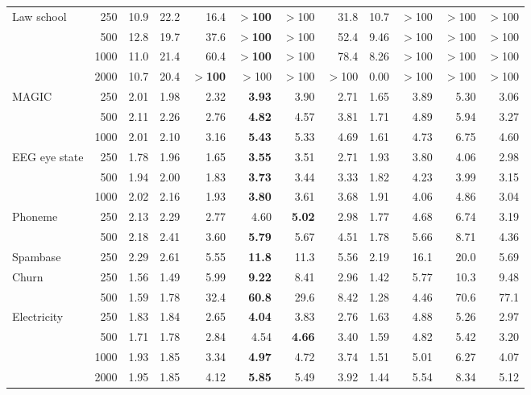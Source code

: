 \begin{tabular}{lrrrrrrrr rrr}
Law school & 250 & 10.9 & 22.2 & 16.4 & \textbf{$>$100} & $>$100 & 31.8 & 10.7 & $>$100 & $>$100 & $>$100 \\
 & 500 & 12.8 & 19.7 & 37.6 & \textbf{$>$100} & $>$100 & 52.4 & 9.46 & $>$100 & $>$100 & $>$100 \\
 & 1000 & 11.0 & 21.4 & 60.4 & \textbf{$>$100} & $>$100 & 78.4 & 8.26 & $>$100 & $>$100 & $>$100 \\
 & 2000 & 10.7 & 20.4 & \textbf{$>$100} & $>$100 & $>$100 & $>$100 & 0.00 & $>$100 & $>$100 & $>$100 \\
\addlinespace
MAGIC & 250 & 2.01 & 1.98 & 2.32 & \textbf{3.93} & 3.90 & 2.71 & 1.65 & 3.89 & 5.30 & 3.06 \\
 & 500 & 2.11 & 2.26 & 2.76 & \textbf{4.82} & 4.57 & 3.81 & 1.71 & 4.89 & 5.94 & 3.27 \\
 & 1000 & 2.01 & 2.10 & 3.16 & \textbf{5.43} & 5.33 & 4.69 & 1.61 & 4.73 & 6.75 & 4.60 \\
\addlinespace
EEG eye state & 250 & 1.78 & 1.96 & 1.65 & \textbf{3.55} & 3.51 & 2.71 & 1.93 & 3.80 & 4.06 & 2.98 \\
 & 500 & 1.94 & 2.00 & 1.83 & \textbf{3.73} & 3.44 & 3.33 & 1.82 & 4.23 & 3.99 & 3.15 \\
 & 1000 & 2.02 & 2.16 & 1.93 & \textbf{3.80} & 3.61 & 3.68 & 1.91 & 4.06 & 4.86 & 3.04 \\
\addlinespace
Phoneme & 250 & 2.13 & 2.29 & 2.77 & 4.60 & \textbf{5.02} & 2.98 & 1.77 & 4.68 & 6.74 & 3.19 \\
 & 500 & 2.18 & 2.41 & 3.60 & \textbf{5.79} & 5.67 & 4.51 & 1.78 & 5.66 & 8.71 & 4.36 \\
\addlinespace
Spambase & 250 & 2.29 & 2.61 & 5.55 & \textbf{11.8} & 11.3 & 5.56 & 2.19 & 16.1 & 20.0 & 5.69 \\
\addlinespace
Churn & 250 & 1.56 & 1.49 & 5.99 & \textbf{9.22} & 8.41 & 2.96 & 1.42 & 5.77 & 10.3 & 9.48 \\
 & 500 & 1.59 & 1.78 & 32.4 & \textbf{60.8} & 29.6 & 8.42 & 1.28 & 4.46 & 70.6 & 77.1 \\
\addlinespace
Electricity & 250 & 1.83 & 1.84 & 2.65 & \textbf{4.04} & 3.83 & 2.76 & 1.63 & 4.88 & 5.26 & 2.97 \\
 & 500 & 1.71 & 1.78 & 2.84 & 4.54 & \textbf{4.66} & 3.40 & 1.59 & 4.82 & 5.42 & 3.20 \\
 & 1000 & 1.93 & 1.85 & 3.34 & \textbf{4.97} & 4.72 & 3.74 & 1.51 & 5.01 & 6.27 & 4.07 \\
 & 2000 & 1.95 & 1.85 & 4.12 & \textbf{5.85} & 5.49 & 3.92 & 1.44 & 5.54 & 8.34 & 5.12 \\
\bottomrule\end{tabular}
